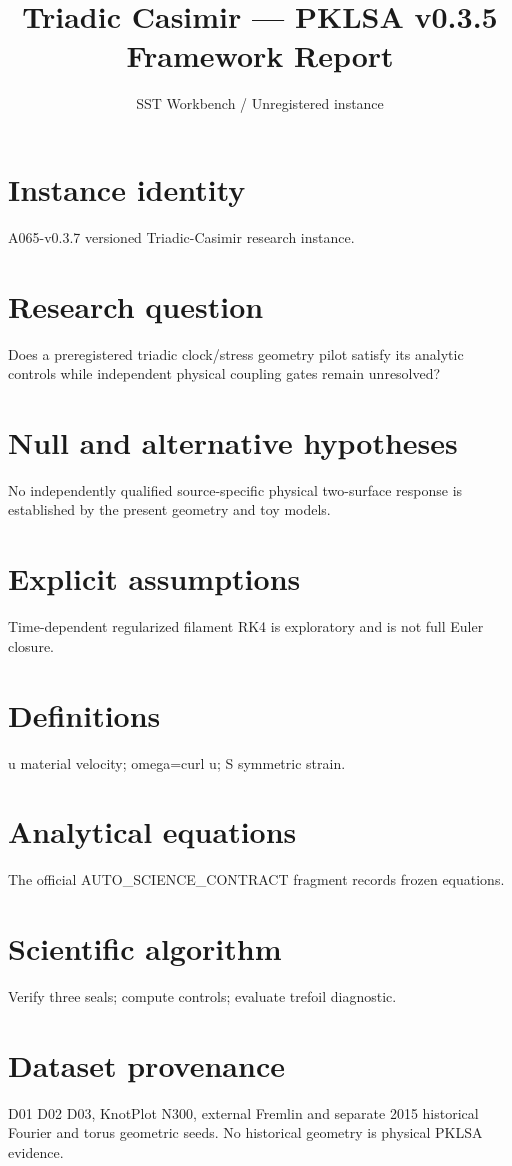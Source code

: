 \documentclass[10pt,a4paper]{article}
\title{Triadic Casimir --- PKLSA v0.3.5 Framework Report}
\author{SST Workbench / Unregistered instance}
\begin{document}
\maketitle
\section{Instance identity}
A065-v0.3.7 versioned Triadic-Casimir research instance.
\section{Research question}
Does a preregistered triadic clock/stress geometry pilot satisfy its analytic controls while independent physical coupling gates remain unresolved?
\section{Null and alternative hypotheses}
No independently qualified source-specific physical two-surface response is established by the present geometry and toy models.
\section{Explicit assumptions}
Time-dependent regularized filament RK4 is exploratory and is not full Euler closure.
\section{Definitions}
u material velocity; omega=curl u; S symmetric strain.
\section{Analytical equations}
The official AUTO\_SCIENCE\_CONTRACT fragment records frozen equations.

\section{Scientific algorithm}
Verify three seals; compute controls; evaluate trefoil diagnostic.
\section{Dataset provenance}
D01 D02 D03, KnotPlot N300, external Fremlin and separate 2015 historical Fourier and torus geometric seeds. No historical geometry is physical PKLSA evidence.
\end{document}
